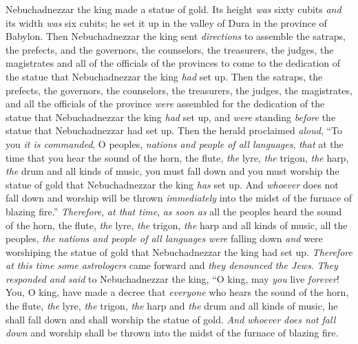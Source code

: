 \begin{biblechapter} %
 Nebuchadnezzar the king made a statue of gold. Its height \textit{was} sixty cubits \textit{and} its width \textit{was} six cubits; he set it up in the valley of Dura in the province of Babylon.
\verse Then Nebuchadnezzar the king sent \textit{directions} to assemble the satraps, the prefects, and the governors, the counselors, the treasurers, the judges, the magistrates and all of the officials of the provinces to come to the dedication of the statue that Nebuchadnezzar the king \textit{had} set up.
\verse Then the satraps, the prefects, the governors, the counselors, the treasurers, the judges, the magistrates, and all the officials of the province \textit{were} assembled for the dedication of the statue that Nebuchadnezzar the king \textit{had} set up, and \textit{were} standing \textit{before} the statue that Nebuchadnezzar had set up.
\verse Then the herald proclaimed \textit{aloud}, “To you \textit{it is commanded}, O peoples, \textit{nations and people of all languages},
\verse \textit{that} at the time that you hear the sound of the horn, the flute, \textit{the} lyre, \textit{the} trigon, \textit{the} harp, \textit{the} drum and all kinds of music, you must fall down and you must worship the statue of gold that Nebuchadnezzar the king \textit{has} set up.
\verse And \textit{whoever} does not fall down and worship will be thrown \textit{immediately} into the midst of the furnace of blazing fire.”
\verse \textit{Therefore}, \textit{at that time}, \textit{as soon as} all the peoples heard the sound of the horn, the flute, \textit{the} lyre, \textit{the} trigon, \textit{the} harp and all kinds of music, all the peoples, \textit{the nations and people of all languages} \textit{were} falling down \textit{and} were worshiping the statue of gold that Nebuchadnezzar the king had set up.
\verse \textit{Therefore} \textit{at this time} \textit{some} \textit{astrologers} came forward and \textit{they denounced the Jews}.
\verse \textit{They responded and said} to Nebuchadnezzar the king, “O king, may \textit{you} live \textit{forever}!
\verse You, O king, have made a decree that \textit{everyone} who hears the sound of the horn, the flute, \textit{the} lyre, \textit{the} trigon, \textit{the} harp and \textit{the} drum and all kinds of music, he shall fall down and shall worship the statue of gold.
\verse \textit{And whoever} \textit{does not fall down} and worship shall be thrown into the midst of the furnace of blazing fire.

\end{biblechapter}
